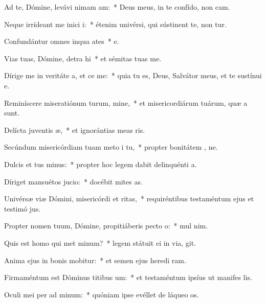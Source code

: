 \item Ad te, Dómine, levávi nimam am:~* Deus meus, in te confído, non cam.
\item Neque irrídeant me inici i:~* étenim univérsi, qui sústinent te, non tur.
\item Confundántur omnes inqua ates~* e.
\item Vias tuas, Dómine, detra hi~* et sémitas tuas  me.
\item Dírige me in veritáte a, et ce me:~* quia tu es, Deus, Salvátor meus, et te sustínui  e.
\item Reminíscere miseratiónum turum, mine,~* et misericordiárum tuárum, quæ a  sunt.
\item Delícta juventis æ,~* et ignorántias meas  ris.
\item Secúndum misericórdiam tuam meto i tu,~* propter bonitátem , ne.
\item Dulcis et tus minus:~* propter hoc legem dabit delinquénti  a.
\item Díriget mansuétos  jucio:~* docébit mites  as.
\item Univérsæ viæ Dómini, misericórdi et ritas,~* requiréntibus testaméntum ejus et testimó jus.
\item Propter nomen tuum, Dómine, propitiáberis pecto o:~* mul  nim.
\item Quis est homo qui met minum?~* legem státuit ei in via,  git.
\item Anima ejus in bonis mobitur:~* et semen ejus heredi ram.
\item Firmaméntum est Dóminus titibus um:~* et testaméntum ipsíus ut manifes lis.
\item Oculi mei per ad minum:~* quóniam ipse evéllet de láqueo  os.

